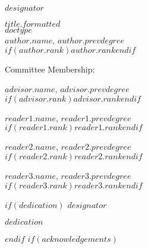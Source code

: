 \documentclass[12pt,letterpaper,toc=flat,oneside]{book}
\begin{document}
	\thispagestyle{empty}
	\setcounter{page}{3}
	\noindent $designator$
	\vfill
	\begin{center}
	    \MakeUppercase{$title.formatted$}\\[10pt]
	    \MakeUppercase{$doctype$}\\[10pt]
	    
	    \begingroup
  \singlespace
    $author.name$, $author.prevdegree$\\ 
    $if(author.rank)$$author.rank$$endif$
    \par
  \endgroup
  
	\bigskip\medskip
	Committee Membership:
	\bigskip\medskip
	
	\begingroup
  \singlespace
    $advisor.name$, $advisor.prevdegree$\\ 
    $if(advisor.rank)$$advisor.rank$$endif$
    \par
  \endgroup
  \bigskip\bigskip
  
  \begingroup
  \singlespace
    $reader1.name$, $reader1.prevdegree$\\ 
    $if(reader1.rank)$$reader1.rank$$endif$
    \par
  \endgroup
  \bigskip\bigskip
  
  \begingroup
  \singlespace
    $reader2.name$, $reader2.prevdegree$\\ 
    $if(reader2.rank)$$reader2.rank$$endif$
    \par
  \endgroup
  \bigskip\bigskip
  
  \begingroup
  \singlespace
    $reader3.name$, $reader3.prevdegree$\\ 
    $if(reader3.rank)$$reader3.rank$$endif$
    \par
  \endgroup
	\end{center}
	\vfill
	\newpage
$if(dedication)$
       \noindent 
       $designator$
       \vfill
       \begin{center}
	   \em{$dedication$}
	   \end{center}
	   \vfill
      \newpage
$endif$
$if(acknowledgements)$
\newenvironment{acknowledgements}{\ackhead}{\acktail}
\newenvironment{acknowledgments}{\ackhead}{\acktail}
\end{document}
